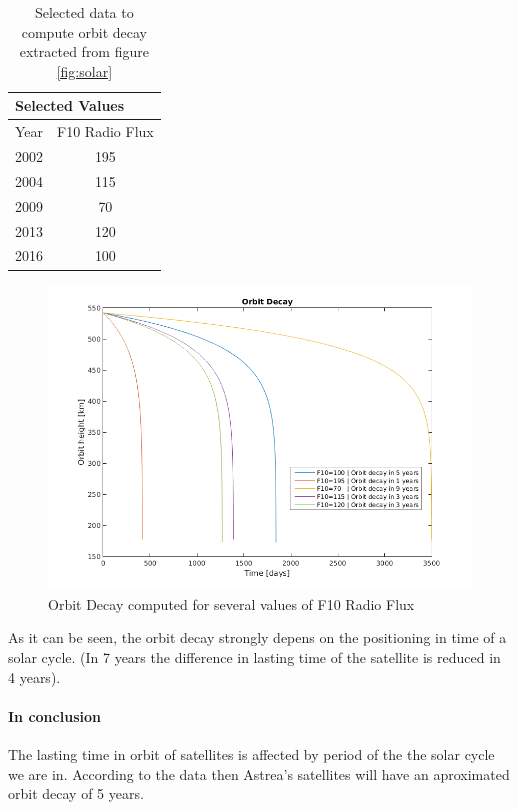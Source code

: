 \begin{table}[]
\centering
\label{OrbDecCompT}
\begin{tabular}{|l|c|}
\hline
\multicolumn{2}{|l|}{Selected Values}      \\ \hline
Year & \multicolumn{1}{l|}{F10 Radio Flux} \\ \hline
2002 & 195                                 \\ \hline
2004 & 115                                 \\ \hline
2009 & 70                                  \\ \hline
2013 & 120                                 \\ \hline
2016 & 100                                 \\ \hline
\end{tabular}
\caption{Selected data to compute orbit decay extracted from figure \ref{fig:solar}}
\end{table}  
\begin{figure}[H] %
\centering
\label{fig:OrbitDecayComp}
\includegraphics[width=.8\textwidth]{OrbitDecayComp.png}
\caption{Orbit Decay computed for several values of F10 Radio Flux}
\end{figure}

As it can be seen, the orbit decay strongly depens on the positioning in time of a solar cycle. (In 7 years the difference in lasting time of the satellite is reduced in 4 years).

\paragraph{In conclusion}
The lasting time in orbit of satellites is affected by period of the the solar cycle we are in. According to the data then Astrea's satellites will have an aproximated orbit decay of 5 years.


 